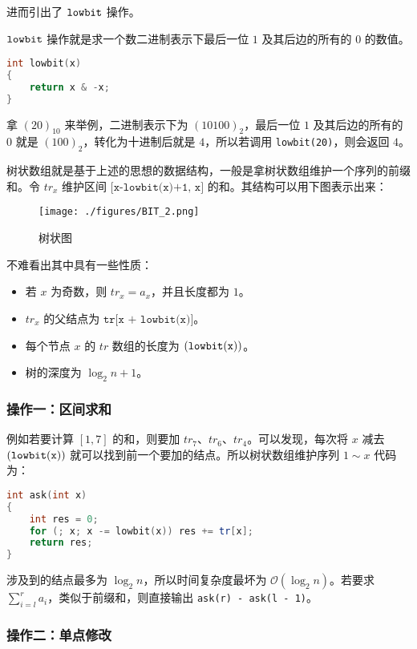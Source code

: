 进而引出了 $\tt lowbit$ 操作。

$\tt lowbit$ 操作就是求一个数二进制表示下最后一位 $1$ 及其后边的所有的 $0$ 的数值。

\begin{lstlisting}[language=cpp]
int lowbit(x)
{
    return x & -x;
}
\end{lstlisting}

拿 $(20)_{10}$ 来举例，二进制表示下为 $(10100)_2$，最后一位 $1$ 及其后边的所有的 $0$ 就是 $(100)_2$，转化为十进制后就是 $4$，所以若调用 \verb|lowbit(20)|，则会返回 $4$。

树状数组就是基于上述的思想的数据结构，一般是拿树状数组维护一个序列的前缀和。令 $tr_x$ 维护区间 $\texttt{[x-lowbit(x)+1, x]}$ 的和。其结构可以用下图表示出来：

\begin{figure}[ht]
\centering
\texttt{[image: ./figures/BIT\_2.png]}
\caption{树状图} \label{BIT_fig2}
\end{figure}

不难看出其中具有一些性质：

\begin{itemize}
\item 若 $x$ 为奇数，则 $tr_x = a_x$，并且长度都为 $1$。
\item $tr_x$ 的父结点为 $\texttt{tr[x + lowbit(x)]}$。
\item 每个节点 $x$ 的 $tr$ 数组的长度为 $\tt (lowbit(x))$。
\item 树的深度为 $\log_2 n + 1$。
\end{itemize}

\subsubsection{操作一：区间求和}

例如若要计算 $[1, 7]$ 的和，则要加 $tr_7$、$tr_6$、$tr_4$。可以发现，每次将 $x$ 减去 $\tt(lowbit(x))$ 就可以找到前一个要加的结点。所以树状数组维护序列 $1 \sim x$ 代码为：

\begin{lstlisting}[language=cpp]
int ask(int x)
{
    int res = 0;
    for (; x; x -= lowbit(x)) res += tr[x];
    return res;
}
\end{lstlisting}

涉及到的结点最多为 $\log_2 n$，所以时间复杂度最坏为 $\mathcal{O}(\log_2 n)$。若要求 $\sum\limits^r_{i = l}a_i$，类似于前缀和，则直接输出 \verb|ask(r) - ask(l - 1)|。

\subsubsection{操作二：单点修改}

